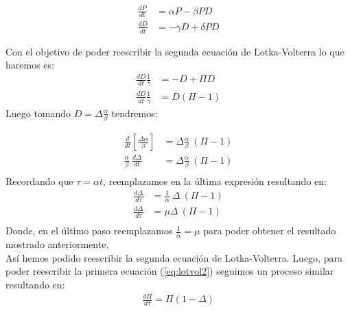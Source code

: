 \documentclass[../portafolio.tex]{subfiles}
\begin{document}
			\begin{align}				
				\frac{dP}{dt} &= \alpha P - \beta PD  \label{eq:lotvol1} \\
				\frac{dD}{dt} &= - \gamma D + \delta PD \label{eq:lotvol2}
			\end{align} 

Con el objetivo de poder reescribir la segunda ecuaci\'on de Lotka-Volterra lo que haremos es:
	\begin{align*}
		\frac{dD}{dt} \frac{1}{\gamma} &= -D + \Pi D \\
		\frac{dD}{dt} \frac{1}{\gamma} &= D(\Pi -1)
	\end{align*}
Luego tomando $ D = \Delta \frac{\alpha}{\beta}$ tendremos:

	\begin{align*}
		\frac{d}{dt}\left[ \frac{\Delta \alpha}{\beta} \right] &= \Delta \frac{\alpha}{\beta}~(\Pi - 1) \\
		\frac{\alpha}{\beta} ~ \frac{d \Delta}{dt} &= \Delta \frac{\alpha}{\beta} ~(\Pi -1) \\
	\end{align*}
Recordando que $\tau = \alpha t$, reemplazamos en la \'ultima expresi\'on resultando en:
	\begin{align*}
	\frac{d \Delta}{d \tau} &= \frac{1}{\alpha} ~ \Delta ~  (\Pi -1) \\
	\frac{d \Delta}{d \tau} &= \mu \Delta ~ (\Pi -1) \\
	\end{align*}
Donde, en el \'ultimo paso reemplazamos $\frac{1}{\alpha} = \mu$ para poder obtener el resultado mostrado anteriormente. \\
As\'i hemos podido reescribir la segunda ecuaci\'on de Lotka-Volterra. Luego, para poder reescribir la primera ecuaci\'on (\ref{eq:lotvol2}) seguimos un proceso similar resultando en: 
	\begin{align*}
		\frac{d \Pi}{d \tau} = \Pi(1- \Delta)
	\end{align*}
\end{document}
